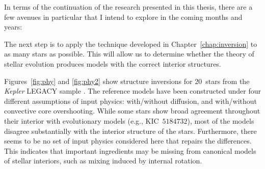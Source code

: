 In terms of the continuation of the research presented in this thesis, there are a few avenues in particular that I intend to explore in the coming months and years: 
\begin{description}
    \setlength{\itemindent}{0pt}
    \item[Structure inversions of more stars.]
    The next step is to apply the technique developed in Chapter~\ref{chap:inversion} to as many stars as possible. 
    This will allow us to determine whether the theory of stellar evolution produces models with the correct interior structures. 
    
    Figures~\ref{fig:phy} and \ref{fig:phy2} show structure inversions for $20$~stars from the \emph{Kepler} LEGACY sample \citep{2017ApJ...835..172L}. 
    The reference models have been constructed under four different assumptions of input physics: with/without diffusion, and with/without convective core overshooting. 
    While some stars show broad agreement throughout their interior with evolutionary models (e.g., KIC~$5184732$), most of the models disagree substantially with the interior structure of the stars. 
    Furthermore, there seems to be no set of input physics considered here that repairs the differences. 
    This indicates that important ingredients may be missing from canonical models of stellar interiors, such as mixing induced by internal rotation. 


\end{description}
